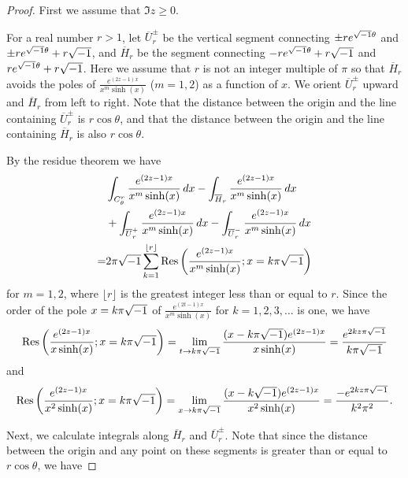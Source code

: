 \begin{proof}
First we assume that $\Im{z}\ge0$.
\par
For a real number $r>1$, let $\overline{U}_{r}^{\pm}$ be the vertical segment connecting $\pm re^{\sqrt{-1}\theta}$ and $\pm re^{\sqrt{-1}\theta}+r\sqrt{-1}$, and $\overline{H}_{r}$ be the segment connecting $-re^{\sqrt{-1}\theta}+r\sqrt{-1}$ and $re^{\sqrt{-1}\theta}+r\sqrt{-1}$.
Here we assume that $r$ is not an integer multiple of $\pi$ so that $\overline{H}_r$ avoids the poles of $\frac{e^{(2z-1)x}}{x^m\sinh(x)}$ ($m=1,2$) as a function of $x$.
We orient $\overline{U}_{r}^{\pm}$ upward and $\overline{H}_{r}$ from left to right.
Note that the distance between the origin and the line containing $\overline{U}_{r}^{\pm}$ is $r\cos\theta$, and that the distance between the origin and the line containing $\overline{H}_{r}$ is also $r\cos\theta$.
\par
By the residue theorem we have
\begin{equation}\label{eq:L1_residue_positive}
\begin{split}
  &\int_{C_{\theta}^{r}}\frac{e^{(2z-1)x}}{x^m\sinh(x)}\,dx
  -
  \int_{\overline{H}_{r}}\frac{e^{(2z-1)x}}{x^m\sinh(x)}\,dx
  \\
  &+
  \int_{\overline{U}^{+}_{r}}\frac{e^{(2z-1)x}}{x^m\sinh(x)}\,dx
  -
  \int_{\overline{U}^{-}_{r}}\frac{e^{(2z-1)x}}{x^m\sinh(x)}\,dx
  \\
  =&
  2\pi\sqrt{-1}
  \sum_{k=1}^{\lfloor{r}\rfloor}
  \operatorname{Res}\left(\frac{e^{(2z-1)x}}{x^m\sinh(x)};x=k\pi\sqrt{-1}\right)
\end{split}
\end{equation}
for $m=1,2$, where $\lfloor{r}\rfloor$ is the greatest integer less than or equal to $r$.
Since the order of the pole $x=k\pi\sqrt{-1}$ of $\frac{e^{(2t-1)x}}{x^m\sinh(x)}$ for $k=1,2,3,\dots$ is one, we have
\begin{equation*}
  \operatorname{Res}\left(\frac{e^{(2z-1)x}}{x\sinh(x)};x=k\pi\sqrt{-1}\right)
  =
  \lim_{t\to k\pi\sqrt{-1}}\frac{(x-k\pi\sqrt{-1})e^{(2z-1)x}}{x\sinh(x)}
  =
  \frac{e^{2kz\pi\sqrt{-1}}}{k\pi\sqrt{-1}}
\end{equation*}
and
\begin{equation*}
  \operatorname{Res}\left(\frac{e^{(2z-1)x}}{x^2\sinh(x)};x=k\pi\sqrt{-1}\right)
  =
  \lim_{x\to k\pi\sqrt{-1}}\frac{(x-k\sqrt{-1})e^{(2z-1)x}}{x^2\sinh(x)}
  =
  \frac{-e^{2kz\pi\sqrt{-1}}}{k^2\pi^2}.
\end{equation*}
\par
Next, we calculate integrals along $\overline{H}_r$ and $\overline{U}_r^{\pm}$.
Note that since the distance between the origin and any point on these segments is greater than or equal to $r\cos\theta$, we have

\end{proof}
